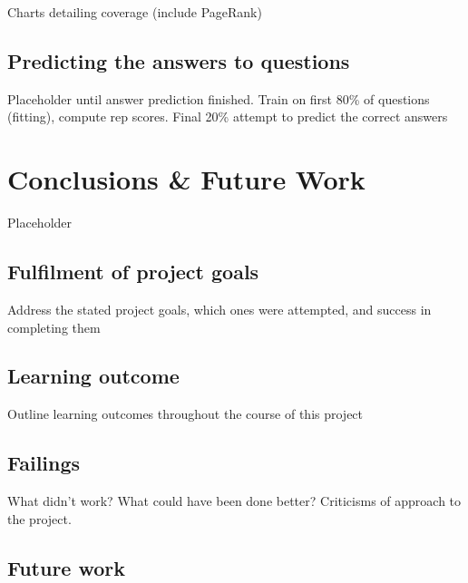 \documentclass[]{final_report}
\begin{document}
Charts detailing coverage (include PageRank)

\section{Predicting the answers to questions}

Placeholder until answer prediction finished. Train on first 80\% of questions (fitting), compute rep scores. Final 20\% attempt to predict the correct answers 

\chapter{Conclusions \& Future Work}

Placeholder

\section{Fulfilment of project goals}

Address the stated project goals, which ones were attempted, and success in completing them

\section{Learning outcome}

Outline learning outcomes throughout the course of this project

\section{Failings}

What didn't work? What could have been done better? Criticisms of approach to the project.

\section{Future work}
\end{document}
